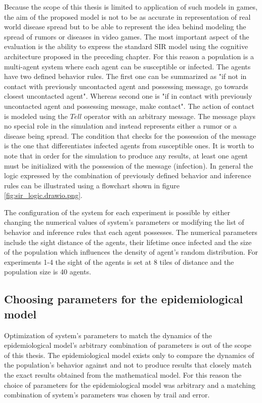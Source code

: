 Because the scope of this thesis is limited to application of such models in games, the aim of the proposed model is not to be as accurate in representation of real world disease spread but to be able to represent the idea behind modeling the spread of rumors or diseases in video games.
The most important aspect of the evaluation is the ability to express the standard SIR model using the cognitive architecture proposed in the preceding chapter.
For this reason a population is a multi-agent system where each agent can be susceptible or infected.
The agents have two defined behavior rules.
The first one can be summarized as "if not in contact with previously uncontacted agent and possessing message, go towards closest uncontacted agent".
Whereas second one is "if in contact with previously uncontacted agent and possessing message, make contact".
The action of contact is modeled using the $Tell$ operator with an arbitrary message.
The message plays no special role in the simulation and instead represents either a rumor or a disease being spread.
The condition that checks for the possession of the message is the one that differentiates infected agents from susceptible ones.
It is worth to note that in order for the simulation to produce any results, at least one agent must be initialized with the possession of the message (infection).
In general the logic expressed by the combination of previously defined behavior and inference rules can be illustrated using a flowchart shown in figure \ref{fig:sir_logic.drawio.png}.

The configuration of the system for each experiment is possible by either changing the numerical values of system's parameters or modifying the list of behavior and inference rules that each agent possesses.
The numerical parameters include the sight distance of the agents, their lifetime once infected and the size of the population which influences the density of agent's random distribution.
For experiments 1-4 the sight of the agents is set at 8 tiles of distance and the population size is 40 agents.


\subsection{Choosing parameters for the epidemiological model}

Optimization of system's parameters to match the dynamics of the epidemiological model's arbitrary combination of parameters is out of the scope of this thesis.
The epidemiological model exists only to compare the dynamics of the population's behavior against and not to produce results that closely match the exact results obtained from the mathematical model.
For this reason the choice of parameters for the epidemiological model was arbitrary and a matching combination of system's parameters was chosen by trail and error.

